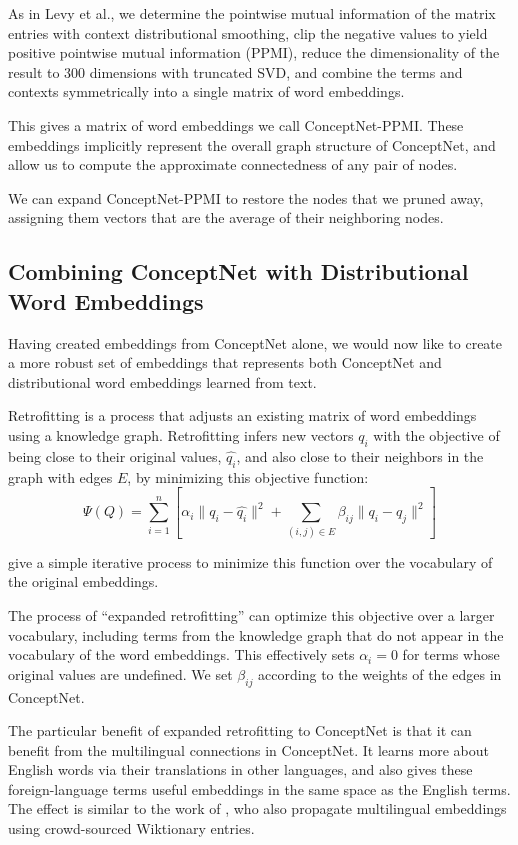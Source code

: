 \documentclass[letterpaper]{article}
\begin{document}
As in Levy et al., we determine the pointwise mutual information of the matrix
entries with context distributional smoothing, clip the negative values to
yield positive pointwise mutual information (PPMI), reduce the dimensionality
of the result to 300 dimensions with truncated SVD, and combine the terms and contexts
symmetrically into a single matrix of word embeddings.

This gives a matrix of word embeddings we call ConceptNet-PPMI.  These
embeddings implicitly represent the overall graph structure of ConceptNet, and
allow us to compute the approximate connectedness of any pair of nodes.

We can expand ConceptNet-PPMI to restore the nodes that we pruned away,
assigning them vectors that are the average of their neighboring nodes.

\subsection{Combining ConceptNet with Distributional Word Embeddings}

Having created embeddings from ConceptNet alone, we would now like to create
a more robust set of embeddings that represents both ConceptNet and distributional
word embeddings learned from text.

Retrofitting \cite{faruqui2015retrofitting} is a process that adjusts an
existing matrix of word embeddings using a knowledge graph. Retrofitting
infers new vectors $q_i$ with the objective of being close to their original
values, $\hat{q_i}$, and also close to their neighbors in the graph with edges $E$,
by minimizing this objective function:
$$\Psi(Q) = \sum_{i=1}^{n}\left[
    \alpha_i \lVert q_i - \hat{q_i} \rVert ^2 + \sum_{(i, j) \in E} \beta_{ij} \lVert q_i - q_j \rVert ^2
\right] $$

\citeauthor{faruqui2015retrofitting} give a simple iterative process to minimize
this function over the vocabulary of the original embeddings.

The process of ``expanded retrofitting'' \cite{speer2016ensemble} can optimize
this objective over a larger vocabulary, including terms from the knowledge
graph that do not appear in the vocabulary of the word embeddings. This
effectively sets $\alpha_i = 0$ for terms whose original values are undefined.
We set $\beta_{ij}$ according to the weights of the edges in ConceptNet.

The particular benefit of expanded retrofitting to ConceptNet is that it can
benefit from the multilingual connections in ConceptNet. It learns more about
English words via their translations in other languages, and also gives these
foreign-language terms useful embeddings in the same space as the English
terms. The effect is similar to the work of \citeauthor{xiao2014distributed}
, who also propagate multilingual embeddings
using crowd-sourced Wiktionary entries.
\end{document}
